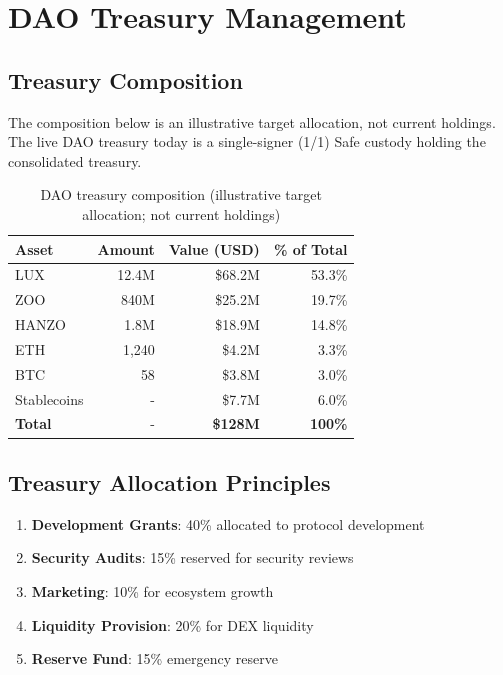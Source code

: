 \section{DAO Treasury Management}


\subsection{Treasury Composition}

The composition below is an illustrative target allocation, not current
holdings. The live DAO treasury today is a single-signer (1/1) Safe custody
holding the consolidated treasury.

\begin{table}[h]
\centering
\begin{tabular}{@{}lrrr@{}}
\toprule
\textbf{Asset} & \textbf{Amount} & \textbf{Value (USD)} & \textbf{\% of Total} \\ \midrule
LUX & 12.4M & \$68.2M & 53.3\% \\
ZOO & 840M & \$25.2M & 19.7\% \\
HANZO & 1.8M & \$18.9M & 14.8\% \\
ETH & 1,240 & \$4.2M & 3.3\% \\
BTC & 58 & \$3.8M & 3.0\% \\
Stablecoins & - & \$7.7M & 6.0\% \\ \midrule
\textbf{Total} & - & \textbf{\$128M} & \textbf{100\%} \\ \bottomrule
\end{tabular}
\caption{DAO treasury composition (illustrative target allocation; not current holdings)}
\end{table}

\subsection{Treasury Allocation Principles}

\begin{enumerate}
\item \textbf{Development Grants}: 40\% allocated to protocol development
\item \textbf{Security Audits}: 15\% reserved for security reviews
\item \textbf{Marketing}: 10\% for ecosystem growth
\item \textbf{Liquidity Provision}: 20\% for DEX liquidity
\item \textbf{Reserve Fund}: 15\% emergency reserve
\end{enumerate}

